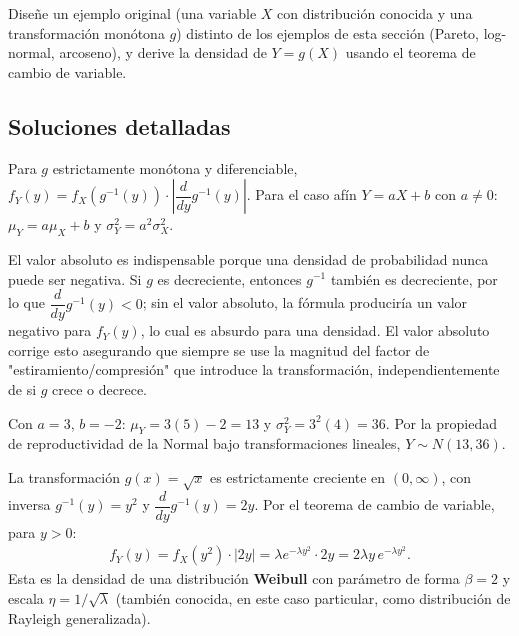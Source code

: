 \begin{problema}
	\label{prob:12a4921}
	Diseñe un ejemplo original (una variable $X$ con distribución conocida y una transformación monótona $g$) distinto de los ejemplos de esta sección (Pareto, log-normal, arcoseno), y derive la densidad de $Y=g(X)$ usando el teorema de cambio de variable.
\end{problema}

\subsection*{Soluciones detalladas}

\begin{solproblema}[prob:d3727e9]
	Para $g$ estrictamente monótona y diferenciable, $f_Y(y) = f_X(g^{-1}(y))\cdot\left|\dfrac{d}{dy}g^{-1}(y)\right|$. Para el caso afín $Y=aX+b$ con $a\neq0$: $\mu_Y = a\mu_X+b$ y $\sigma_Y^2 = a^2\sigma_X^2$.
\end{solproblema}

\begin{solproblema}
	El valor absoluto es indispensable porque una densidad de probabilidad nunca puede ser negativa. Si $g$ es decreciente, entonces $g^{-1}$ también es decreciente, por lo que $\dfrac{d}{dy}g^{-1}(y) < 0$; sin el valor absoluto, la fórmula produciría un valor negativo para $f_Y(y)$, lo cual es absurdo para una densidad. El valor absoluto corrige esto asegurando que siempre se use la magnitud del factor de "estiramiento/compresión" que introduce la transformación, independientemente de si $g$ crece o decrece.
\end{solproblema}

\begin{solproblema}[prob:d795060]
	Con $a=3$, $b=-2$: $\mu_Y = 3(5)-2 = 13$ y $\sigma_Y^2 = 3^2(4) = 36$. Por la propiedad de reproductividad de la Normal bajo transformaciones lineales, $Y \sim N(13, 36)$.
\end{solproblema}

\begin{solproblema}[prob:182603c]
	La transformación $g(x)=\sqrt{x}$ es estrictamente creciente en $(0,\infty)$, con inversa $g^{-1}(y)=y^2$ y $\dfrac{d}{dy}g^{-1}(y) = 2y$. Por el teorema de cambio de variable, para $y>0$:
	\begin{align*}
		f_Y(y) = f_X(y^2)\cdot|2y| = \lambda e^{-\lambda y^2}\cdot 2y = 2\lambda y\,e^{-\lambda y^2}.
	\end{align*}
	Esta es la densidad de una distribución \textbf{Weibull} con parámetro de forma $\beta=2$ y escala $\eta=1/\sqrt{\lambda}$ (también conocida, en este caso particular, como distribución de Rayleigh generalizada).
\end{solproblema}

